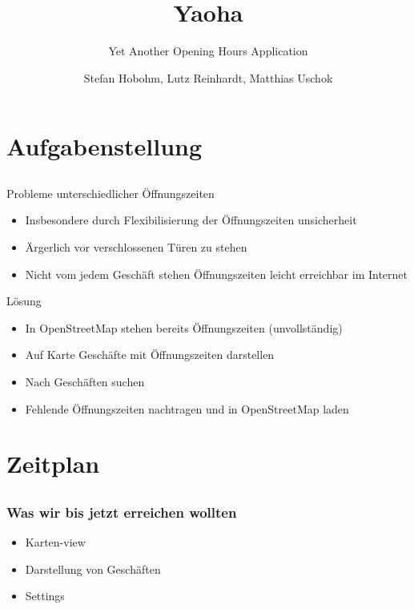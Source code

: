 \documentclass[hyperref]{beamer}
\title{Yaoha}
\subtitle{Yet Another Opening Hours Application}
\author[Hobohm, Reinhardt, Uschok]{Stefan Hobohm, Lutz Reinhardt, Matthias Uschok}
\institute[TU Braunschweig, IBR]{Technische Universität Braunschweig, IBR}
\begin{document}
\frame[plain]{\titlepage}


\section{Aufgabenstellung}
\subsection{}

\begin{frame}{Probleme unterschiedlicher Öffnungszeiten}
\begin{itemize}
\item Insbesondere durch Flexibilisierung der Öffnungszeiten unsicherheit
\item Ärgerlich vor verschlossenen Türen zu stehen
\item Nicht vom jedem Geschäft stehen Öffnungszeiten leicht erreichbar im Internet
\end{itemize}
\end{frame}

\begin{frame}{Lösung}
\begin{itemize}
\item In OpenStreetMap stehen bereits Öffnungszeiten (unvollständig)
\item Auf Karte Geschäfte mit Öffnungszeiten darstellen
\item Nach Geschäften suchen
\item Fehlende Öffnungszeiten nachtragen und in OpenStreetMap laden
\end{itemize}
\end{frame}

\section{Zeitplan}
\subsection{}


\begin{frame}
  \frametitle{Was wir bis jetzt erreichen wollten}
  \begin{itemize}
    \item Karten-view
    \item Darstellung von Geschäften
    \item Settings
  \end{itemize}
\end{frame}
\end{document}
